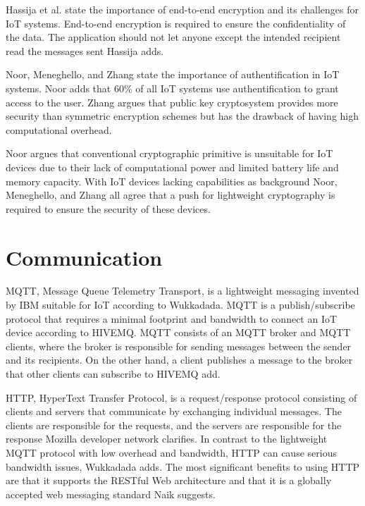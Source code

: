 Hassija et al. state the importance of end-to-end encryption and its challenges for IoT systems.
End-to-end encryption is required to ensure the confidentiality of the data. The application should not let anyone except the intended recipient read the messages sent Hassija adds.\cite{Hassija2019}

Noor, Meneghello, and Zhang state the importance of authentification in IoT systems.\cite{Noor2019,Meneghello2019,Zhang2014} 
Noor adds that 60\% of all IoT systems use authentification to grant access to the user.\cite{Noor2019}  
Zhang argues that public key cryptosystem provides more security than symmetric encryption schemes but has the drawback of having high computational overhead.\cite{Zhang2014} 

Noor argues that conventional cryptographic primitive is unsuitable for IoT devices due to their lack of computational power and limited battery life and memory capacity.\cite{Noor2019}
With IoT devices lacking capabilities as background Noor, Meneghello, and Zhang all agree that a push for lightweight cryptography is required to ensure the security of these devices.\cite {Noor2019,Meneghello2019,Zhang2014} 

\section{Communication} 
MQTT, Message Queue Telemetry Transport, is a lightweight messaging invented by IBM suitable for IoT according to Wukkadada.\cite{Wukkadada2018} 
MQTT is a publish/subscribe protocol that requires a minimal footprint and bandwidth to connect an IoT device according to HIVEMQ.\cite{MQTT2021}
MQTT consists of an MQTT broker and MQTT clients, where the broker is responsible for sending messages between the sender and its recipients.\cite{Wukkadada2018}
On the other hand, a client publishes a message to the broker that other clients can subscribe to HIVEMQ add.\cite{MQTT2021}

HTTP, HyperText Transfer Protocol, is a request/response protocol consisting of clients and servers that communicate by exchanging individual messages. 
The clients are responsible for the requests, and the servers are responsible for the response Mozilla developer network clarifies. \cite{HTTP2021} 
In contrast to the lightweight MQTT protocol with low overhead and bandwidth, HTTP can cause serious bandwidth issues, Wukkadada adds. \cite{Wukkadada2018}
The most significant benefits to using HTTP are that it supports the RESTful Web architecture and that it is a globally accepted web messaging standard Naik suggests. \cite{Naik2017} 

